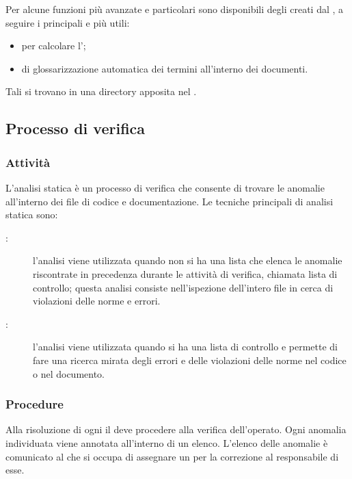 \documentclass[a4paper, titlepage]{article}
\begin{document}
Per alcune funzioni più avanzate e particolari sono disponibili degli  creati dal , a seguire i principali e più utili:
\begin{itemize}
	\item {} per calcolare l';
	\item {} di glossarizzazione automatica dei termini all'interno dei documenti.
\end{itemize}
Tali  si trovano in una directory apposita nel .

\newpage

\subsection{Processo di verifica}

\subsubsection{Attività}


L'analisi statica è un processo di verifica che consente di trovare le anomalie all'interno dei file di codice e documentazione. Le tecniche principali di analisi statica sono:
\begin{description}
	\item[:] l'analisi  viene utilizzata quando non si ha una lista che elenca le anomalie riscontrate in precedenza durante le attività di verifica, chiamata lista di controllo; questa analisi consiste nell'ispezione dell'intero file in cerca di violazioni delle norme e errori.
	\item[:] l'analisi  viene utilizzata quando si ha una lista di controllo e permette di fare una ricerca mirata degli errori e delle violazioni delle norme nel codice o nel documento.
\end{description}

\subsubsection{Procedure}

Alla risoluzione di ogni  il  deve procedere alla verifica dell'operato. Ogni anomalia individuata viene annotata all'interno di un elenco. L'elenco delle anomalie è comunicato al  che si occupa di assegnare un  per la correzione al responsabile di esse.
\end{document}
